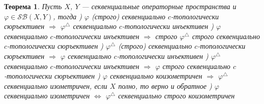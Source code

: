 \documentclass[12pt]{article}
\newtheorem{theorem}{Теорема}[subsection]
\begin{document}
\begin{theorem}\label{ThDualSQOps}
Пусть $X$, $Y$ --- секвенциальные операторные пространства и $\varphi\in\mathcal{SB}(X,Y)$, тогда
) $\varphi$ (строго) секвенциально $c$-топологически сюръективен $\Longrightarrow$
$ \varphi^\triangle$ секвенциально $c$-топологически инъективен
) $\varphi$ секвенциально $c$-топологически инъективен $\Longrightarrow$ строго
$ \varphi^\triangle$ строго секвенциально $c$-топологически сюръективен
) $\varphi^\triangle$ (строго) секвенциально $c$-топологически сюръективен $\Longrightarrow$
$ \varphi$ секвенциально $c$-топологически инъективен
) $\varphi^\triangle$ секвенциально $c$-топологически инъективен $\Longrightarrow$
$ \varphi$ строго секвенциально $c$-топологически сюръективен
) $\varphi$ секвенциально коизометричен $\Longrightarrow$ 
$\varphi^\triangle$ секвенциально изометричен, если $X$ полно, то верно и обратное
) $ \varphi$ секвенциально изометричен $\Longleftrightarrow$
$\varphi^\triangle$ секвенциально строго коизометричен
\end{theorem}
\end{document}
